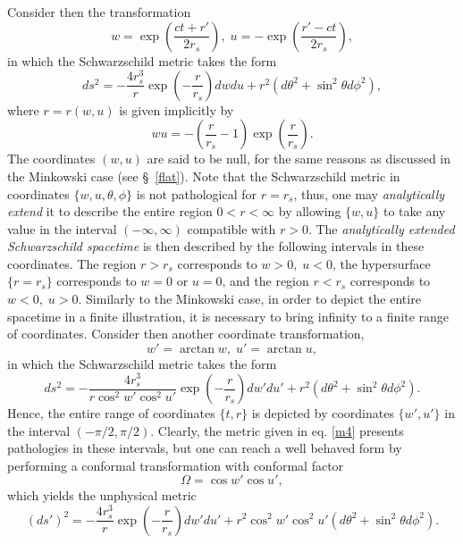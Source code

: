 \documentclass[
12pt,		%
openright,	%
twoside,  %
a4paper,			%
chapter=TITLE,		%
english,			%
french,				%
spanish,			%
brazil				%
]{USPSC-classe/USPSC}
\begin{document}
Consider then the transformation
\begin{equation}\label{eq199}
    w=\exp{\left(\frac{ct+r'}{2r_s}\right)},\;u=-\exp{\left(\frac{r'-ct}{2r_s}\right)},
\end{equation}
in which the Schwarzschild metric takes the form
\begin{equation}\label{m3}
    ds^2=-\frac{4r_s^3}{r}\exp{\left(-\frac{r}{r_s}\right)}dwdu+r^2(d\theta^2+\sin^2\theta d\phi^2),
\end{equation}
where $r=r(w,u)$ is given implicitly by 
\begin{equation}
    wu=-\left(\frac{r}{r_s}-1\right)\exp{\left(\frac{r}{r_s}\right)}. 
\end{equation}
The coordinates $(w,u)$ are said to be null, for the same reasons as discussed in the Minkowski case (see \S~\ref{flat}). Note that the Schwarzschild metric in coordinates $\{w,u,\theta,\phi\}$ is not pathological for $r=r_s$, thus, one may \textit{analytically extend} it \cite{Townsend1997} to describe the entire region $0<r<\infty$ by allowing $\{w,u\}$ to take any value in the interval $(-\infty,\infty)$ compatible with $r>0$. The \textit{analytically extended Schwarzschild spacetime} is then described by the following intervals in these coordinates. The region $r>r_s$ corresponds to $w>0,\;u<0$, the hypersurface $\{r=r_s\}$ corresponds to $w=0$ or $u=0$, and the region $r<r_s$ corresponds to $w<0,\;u>0$. Similarly to the Minkowski case, in order to depict the entire spacetime in a finite illustration, it is necessary to bring infinity to a finite range of coordinates. Consider then another coordinate transformation,
\begin{equation}
    w'=\arctan{w},\;
    u'=\arctan{u},
\end{equation}
in which the Schwarzschild metric takes the form
\begin{equation}\label{m4}
    ds^2=-\frac{4r_s^3}{r\cos^2{w'}\cos^2{u'}}\exp{\left(-\frac{r}{r_s}\right)}dw'du'+r^2(d\theta^2+\sin^2\theta d\phi^2).
\end{equation}
Hence, the entire range of coordinates $\{t,r\}$ is depicted by coordinates $\{w',u'\}$ in the interval $(-\pi/2,\pi/2)$. Clearly, the metric given in eq. \ref{m4} presents pathologies in these intervals, but one can reach a well behaved form by performing a conformal transformation with conformal factor
\begin{equation}\label{13}
   \Omega=\cos{w'}\cos{u'},  
\end{equation}
which yields the unphysical metric
\begin{equation}
    (ds')^2=-\frac{4r_s^3}{r}\exp{\left(-\frac{r}{r_s}\right)}dw'du'+r^2\cos^2{w'}\cos^2{u'}(d\theta^2+\sin^2\theta d\phi^2).
\end{equation}
\end{document}
